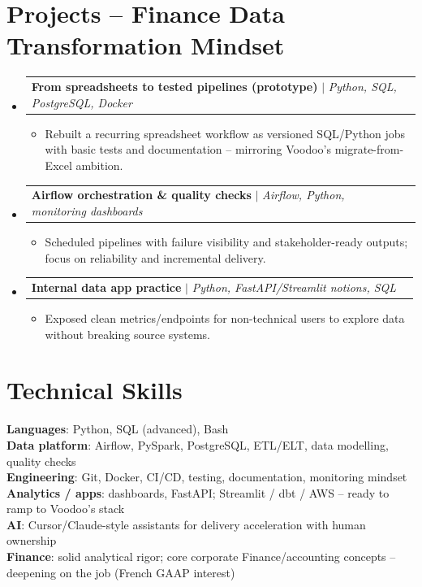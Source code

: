 \documentclass[letterpaper,10.5pt]{article}
\makeatletter
\newcommand{\resumeItem}[1]{\item\small{#1}}
\newcommand{\resumeProjectHeading}[2]{
  \vspace{2pt}\item
  \begin{tabular*}{0.97\textwidth}{l@{\extracolsep{\fill}}r}
    \small #1 & #2 \\
  \end{tabular*}\vspace{1pt}
}
\newcommand{\resumeSubHeadingListStart}{\begin{itemize}[leftmargin=0.08in, label={}]}
\newcommand{\resumeSubHeadingListEnd}{\end{itemize}}
\makeatother
\begin{document}
\section{Projects -- Finance Data Transformation Mindset}
\resumeSubHeadingListStart
  \resumeProjectHeading
    {\textbf{From spreadsheets to tested pipelines (prototype)} $|$ \emph{Python, SQL, PostgreSQL, Docker}}{}
    \begin{itemize}
      \resumeItem{Rebuilt a recurring spreadsheet workflow as versioned SQL/Python jobs with basic tests and documentation -- mirroring Voodoo's migrate-from-Excel ambition.}
    \end{itemize}
  \resumeProjectHeading
    {\textbf{Airflow orchestration \& quality checks} $|$ \emph{Airflow, Python, monitoring dashboards}}{}
    \begin{itemize}
      \resumeItem{Scheduled pipelines with failure visibility and stakeholder-ready outputs; focus on reliability and incremental delivery.}
    \end{itemize}
  \resumeProjectHeading
    {\textbf{Internal data app practice} $|$ \emph{Python, FastAPI/Streamlit notions, SQL}}{}
    \begin{itemize}
      \resumeItem{Exposed clean metrics/endpoints for non-technical users to explore data without breaking source systems.}
    \end{itemize}
\resumeSubHeadingListEnd

\section{Technical Skills}
\begin{itemize}[leftmargin=0.08in, label={}]
  \small{\item{
    \textbf{Languages}: Python, SQL (advanced), Bash \\
    \textbf{Data platform}: Airflow, PySpark, PostgreSQL, ETL/ELT, data modelling, quality checks \\
    \textbf{Engineering}: Git, Docker, CI/CD, testing, documentation, monitoring mindset \\
    \textbf{Analytics / apps}: dashboards, FastAPI; Streamlit / dbt / AWS -- ready to ramp to Voodoo's stack \\
    \textbf{AI}: Cursor/Claude-style assistants for delivery acceleration with human ownership \\
    \textbf{Finance}: solid analytical rigor; core corporate Finance/accounting concepts -- deepening on the job (French GAAP interest)
  }}
\end{itemize}
\end{document}
